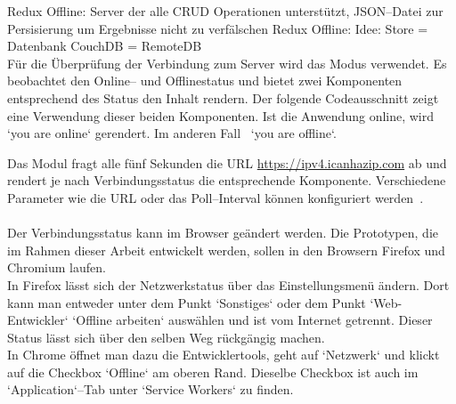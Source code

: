 %   
%
%
Redux Offline: Server der alle \gls{CRUD} Operationen unterstützt,
\gls{JSON}--Datei zur Persisierung um Ergebnisse nicht zu verfälschen 
Redux Offline: Idee: Store = Datenbank
CouchDB = RemoteDB\\
%
%
Für die Überprüfung der Verbindung zum Server wird das Modus  verwendet. Es beobachtet den Online-- und Offlinestatus und bietet zwei Komponenten entsprechend des Status den Inhalt rendern. Der folgende Codeausschnitt zeigt eine Verwendung dieser beiden Komponenten. Ist die Anwendung online, wird `you are online` gerendert. Im anderen Fall ~`you are offline`.
%
\begin{center}

\end{center}
%
Das Modul fragt alle fünf Sekunden die URL \url{https://ipv4.icanhazip.com} ab und rendert je nach Verbindungsstatus die entsprechende Komponente. Verschiedene Parameter wie die URL oder das Poll--Interval können konfiguriert werden~\cite{react-detect}.\\\\
%
Der Verbindungsstatus kann im Browser geändert werden. Die Prototypen, die im Rahmen dieser Arbeit entwickelt werden, sollen in den Browsern Firefox und Chromium laufen.\\
In Firefox lässt sich der Netzwerkstatus über das Einstellungsmenü ändern. Dort kann man entweder unter dem Punkt `Sonstiges` oder dem Punkt `Web-Entwickler` `Offline arbeiten` auswählen und ist vom Internet getrennt. Dieser Status lässt sich über den selben Weg rückgängig machen.\\
In Chrome öffnet man dazu die Entwicklertools, geht auf `Netzwerk` und klickt auf die Checkbox `Offline` am oberen Rand. Dieselbe Checkbox ist auch im `Application`--Tab unter `Service Workers` zu finden.
%
%

%
%
